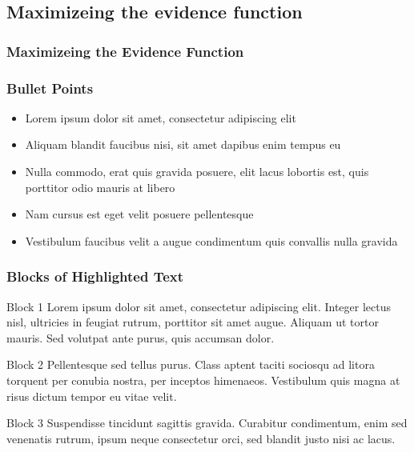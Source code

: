\documentclass{beamer}
\begin{document}
\subsection{Maximizeing the evidence function}

\begin{frame}
\frametitle{Maximizeing the Evidence Function}

\end{frame}


\begin{frame}
\frametitle{Bullet Points}
\begin{itemize}
\item Lorem ipsum dolor sit amet, consectetur adipiscing elit
\item Aliquam blandit faucibus nisi, sit amet dapibus enim tempus eu
\item Nulla commodo, erat quis gravida posuere, elit lacus lobortis est, quis porttitor odio mauris at libero
\item Nam cursus est eget velit posuere pellentesque
\item Vestibulum faucibus velit a augue condimentum quis convallis nulla gravida
\end{itemize}
\end{frame}


\begin{frame}
\frametitle{Blocks of Highlighted Text}
\begin{block}{Block 1}
Lorem ipsum dolor sit amet, consectetur adipiscing elit. Integer lectus nisl, ultricies in feugiat rutrum, porttitor sit amet augue. Aliquam ut tortor mauris. Sed volutpat ante purus, quis accumsan dolor.
\end{block}

\begin{block}{Block 2}
Pellentesque sed tellus purus. Class aptent taciti sociosqu ad litora torquent per conubia nostra, per inceptos himenaeos. Vestibulum quis magna at risus dictum tempor eu vitae velit.
\end{block}

\begin{block}{Block 3}
Suspendisse tincidunt sagittis gravida. Curabitur condimentum, enim sed venenatis rutrum, ipsum neque consectetur orci, sed blandit justo nisi ac lacus.
\end{block}
\end{frame}
\end{document}
